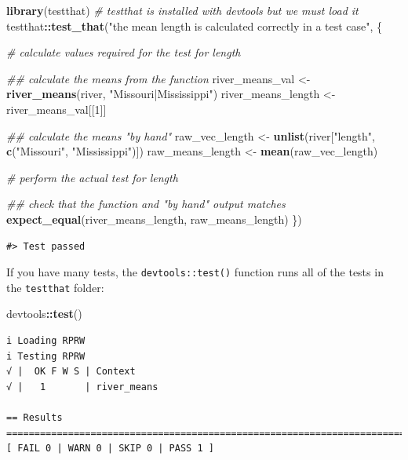 \documentclass[
]{book}
\newenvironment{Shaded}{\begin{snugshade}}{\end{snugshade}}
\newcommand{\CommentTok}[1]{\textcolor[rgb]{0.56,0.35,0.01}{\textit{#1}}}
\newcommand{\DecValTok}[1]{\textcolor[rgb]{0.00,0.00,0.81}{#1}}
\newcommand{\KeywordTok}[1]{\textcolor[rgb]{0.13,0.29,0.53}{\textbf{#1}}}
\newcommand{\NormalTok}[1]{#1}
\newcommand{\OperatorTok}[1]{\textcolor[rgb]{0.81,0.36,0.00}{\textbf{#1}}}
\newcommand{\StringTok}[1]{\textcolor[rgb]{0.31,0.60,0.02}{#1}}
\begin{document}
\begin{Shaded}
\begin{Highlighting}[]
\KeywordTok{library}\NormalTok{(testthat) }\CommentTok{# testthat is installed with devtools but we must load it}
\NormalTok{testthat}\OperatorTok{::}\KeywordTok{test_that}\NormalTok{(}\StringTok{"the mean length is calculated correctly in a test case"}\NormalTok{, \{}
  
  \CommentTok{# calculate values required for the test for length}

  \CommentTok{## calculate the means from the function}
\NormalTok{  river_means_val <-}\StringTok{ }\KeywordTok{river_means}\NormalTok{(river, }\StringTok{"Missouri|Mississippi"}\NormalTok{)}
\NormalTok{  river_means_length <-}\StringTok{ }\NormalTok{river_means_val[[}\DecValTok{1}\NormalTok{]]}

  \CommentTok{## calculate the means "by hand"}
\NormalTok{  raw_vec_length <-}\StringTok{ }\KeywordTok{unlist}\NormalTok{(river[}\StringTok{"length"}\NormalTok{, }\KeywordTok{c}\NormalTok{(}\StringTok{"Missouri"}\NormalTok{, }\StringTok{"Mississippi"}\NormalTok{)])}
\NormalTok{  raw_means_length <-}\StringTok{ }\KeywordTok{mean}\NormalTok{(raw_vec_length)}
  
  \CommentTok{# perform the actual test for length}

  \CommentTok{## check that the function and "by hand" output matches}
  \KeywordTok{expect_equal}\NormalTok{(river_means_length, raw_means_length)}
\NormalTok{\})}
\end{Highlighting}
\end{Shaded}

\begin{verbatim}
#> Test passed
\end{verbatim}

If you have many tests, the \texttt{devtools::test()} function runs all of the tests in the \texttt{testthat} folder:

\begin{Shaded}
\begin{Highlighting}[]
\NormalTok{devtools}\OperatorTok{::}\KeywordTok{test}\NormalTok{()}
\end{Highlighting}
\end{Shaded}

\begin{verbatim}
i Loading RPRW
i Testing RPRW
√ |  OK F W S | Context
√ |   1       | river_means                                                     
                                               
== Results =========================================================================
[ FAIL 0 | WARN 0 | SKIP 0 | PASS 1 ]
\end{verbatim}
\end{document}
